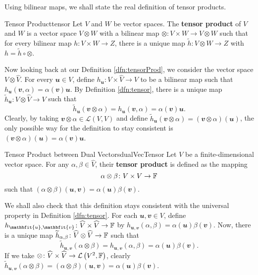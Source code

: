 \documentclass[math, code]{amznotes}
\theoremstyle{remark}
\begin{document}
Using bilinear maps, we shall state the real definition of tensor products.
\begin{dfnbox}{Tensor Product}{tensor}
    Let $V$ and $W$ be vector spaces. The {\color{red} \textbf{tensor product}} of $V$ and $W$ is a vector space $V \otimes W$ with a bilinear map $\otimes \colon V \times W \to V \otimes W$ such that for every bilinear map $h \colon V \times W \to Z$, there is a unique map $\widetilde{h} \colon V \otimes W \to Z$ with $h = \widetilde{h} \circ \otimes$.
\end{dfnbox}
Now looking back at our Definition \ref{dfn:tensorProd}, we consider the vector space $V \otimes \widehat{V}$. For every $\mathbfit{u} \in V$, define $h_{\mathbfit{u}} \colon V \times \widehat{V} \to V$ to be a bilinear map such that $h_{\mathbfit{u}}(\mathbfit{v}, \alpha) = \alpha(\mathbfit{v})\mathbfit{u}$. By Definition \ref{dfn:tensor}, there is a unique map $\widetilde{h}_{\mathbfit{u}} \colon V \otimes \widehat{V} \to V$ such that 
\begin{equation*}
    \widetilde{h}_{\mathbfit{u}}(\mathbfit{v} \otimes \alpha) = h_{\mathbfit{u}}(\mathbfit{v}, \alpha) = \alpha(\mathbfit{v})\mathbfit{u}.
\end{equation*}
Clearly, by taking $\mathbfit{v} \otimes \alpha \in \mathcal{L}(V, V)$ and define $\widetilde{h}_{\mathbfit{u}}(\mathbfit{v} \otimes \alpha) = (\mathbfit{v} \otimes \alpha)(\mathbfit{u})$, the only possible way for the definition to stay consistent is $(\mathbfit{v} \otimes \alpha)(\mathbfit{u}) = \alpha(\mathbfit{v})\mathbfit{u}$.
\begin{dfnbox}{Tensor Product between Dual Vectors}{dualVecTensor}
    Let $V$ be a finite-dimensional vector space. For any $\alpha, \beta \in \widehat{V}$, their {\color{red} \textbf{tensor product}} is defined as the mapping 
    \begin{equation*}
        \alpha \otimes \beta \colon V \times V \to \mathbb{F}
    \end{equation*}
    such that $(\alpha \otimes \beta)(\mathbfit{u}, \mathbfit{v}) = \alpha(\mathbfit{u})\beta(\mathbfit{v})$.
\end{dfnbox}
We shall also check that this definition stays consistent with the universal property in Definition \ref{dfn:tensor}. For each $\mathbfit{u}, \mathbfit{v} \in V$, define $h_{\mathbfit{u}, \mathbfit{v}} \colon \widehat{V} \times \widehat{V} \to \F$ by $h_{\mathbfit{u}, \mathbfit{v}}(\alpha, \beta) = \alpha(\mathbfit{u})\beta(\mathbfit{v})$. Now, there is a unique map $\widetilde{h}_{\alpha, \beta} \colon \widehat{V} \otimes \widehat{V} \to \mathbb{F}$ such that 
\begin{equation*}
    \widetilde{h}_{\mathbfit{u}, \mathbfit{v}}(\alpha \otimes \beta) = h_{\mathbfit{u}, \mathbfit{v}}(\alpha, \beta) = \alpha(\mathbfit{u})\beta(\mathbfit{v}).
\end{equation*}
If we take $\otimes \colon \widehat{V} \times \widehat{V} \to \mathcal{L}\left(V^2, \mathbb{F}\right)$, clearly $\widetilde{h}_{\mathbfit{u}, \mathbfit{v}}(\alpha \otimes \beta) = (\alpha \otimes \beta)(\mathbfit{u}, \mathbfit{v}) = \alpha(\mathbfit{u})\beta(\mathbfit{v})$.
\end{document}
